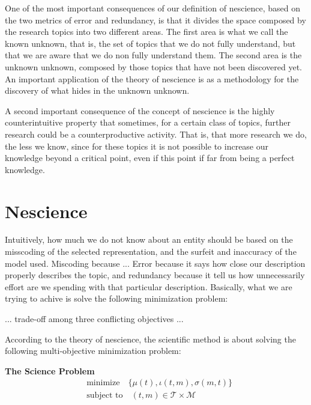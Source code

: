 One of the most important consequences of our definition of nescience, based on the two metrics of error and redundancy, is that it divides the space composed by the research topics into two different areas. The first area is what we call the known unknown, that is, the set of topics that we do not fully understand, but that we are aware that we do non fully understand them. The second area is the unknown unknown, composed by those topics that have not been discovered yet. An important application of the theory of nescience is as a methodology for the discovery of what hides in the unknown unknown.

A second important consequence of the concept of nescience is the highly counterintuitive property that sometimes, for a certain class of topics, further research could be a counterproductive activity. That is, that more research we do, the less we know, since for these topics it is not possible to increase our knowledge beyond a critical point, even if this point if far from being a perfect knowledge.

%
%

\section{Nescience}

Intuitively, how much we do not know about an entity should be based on the misscoding of the selected representation, and the surfeit and inaccuracy of the model used. Miscoding because ... Error because it says how close our description properly describes the topic, and redundancy because it tell us how unnecessarily effort are we spending with that particular description. Basically, what we are trying to achive is solve the following minimization problem:

... trade-off among three conflicting objectives ...

According to the theory of nescience, the scientific method is about solving the following multi-objective minimization problem:

\begin{tBox}
\textbf{The Science Problem}
\begin{align*}
 & \text{minimize} \quad \{ \mu(t), \iota(t, m), \sigma(m, t)\} \\
 & \text{subject to} \quad (t, m) \in \mathcal{T} \times \mathcal{M}
\end{align*}
\end{tBox}

